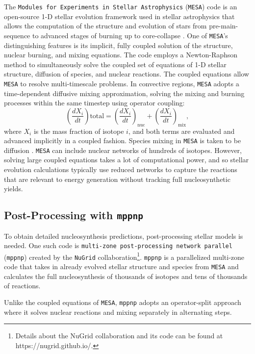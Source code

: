 The \texttt{Modules for Experiments in Stellar Astrophysics} (\texttt{MESA}) code is an open-source 1-D stellar evolution framework used in stellar astrophysics that allows the computation of the structure and evolution of stars from pre-main-sequence to advanced stages of burning up to core-collapse \citep{paxtonMODULESEXPERIMENTSLAR2010}.
One of \texttt{MESA}’s distinguishing features is its implicit, fully coupled solution of the structure, nuclear burning, and mixing equations. 
The code employs a Newton-Raphson method to simultaneously solve the coupled set of equations of 1-D stellar structure, diffusion of species, and nuclear reactions.
The coupled equations allow \texttt{MESA} to resolve multi-timescale problems.
In convective regions, \texttt{MESA} adopts a time-dependent diffusive mixing approximation, solving the mixing and burning processes within the same timestep using operator coupling:
\begin{equation}
\left( \frac{dX_i}{dt} \right)\text{total} = \left( \frac{dX_i}{dt} \right)_\text{nuc} + \left( \frac{dX_i}{dt} \right)_\text{mix},
\end{equation}
where $X_i$ is the mass fraction of isotope $i$, and both terms are evaluated and advanced implicitly in a coupled fashion. 
Species mixing in \texttt{MESA} is taken to be diffusion \citep{paxtonMODULESEXPERIMENTSLAR2010}.
\texttt{MESA} can include nuclear networks of hundreds of isotopes.
However, solving large coupled equations takes a lot of computational power, and so stellar evolution calculations typically use reduced networks to capture the reactions that are relevant to energy generation without tracking full nucleosynthetic yields.

\subsection{Post-Processing with \texttt{mppnp}}

To obtain detailed nucleosynthesis predictions, post-processing stellar models is needed.
One such code is \texttt{multi-zone post-processing network parallel} (\texttt{mppnp}) created by the \texttt{NuGrid} collaboration\footnote{Details about the NuGrid collaboration and its code can be found at https://nugrid.github.io/.}.
\texttt{mppnp} is a parallelized multi-zone code that takes in already evolved stellar structure and species from \texttt{MESA} and calculates the full nucleosynthesis of thousands of isotopes and tens of thousands of reactions.

Unlike the coupled equations of \texttt{MESA}, \texttt{mppnp} adopts an operator-split approach where it solves nuclear reactions and mixing separately in alternating steps.

